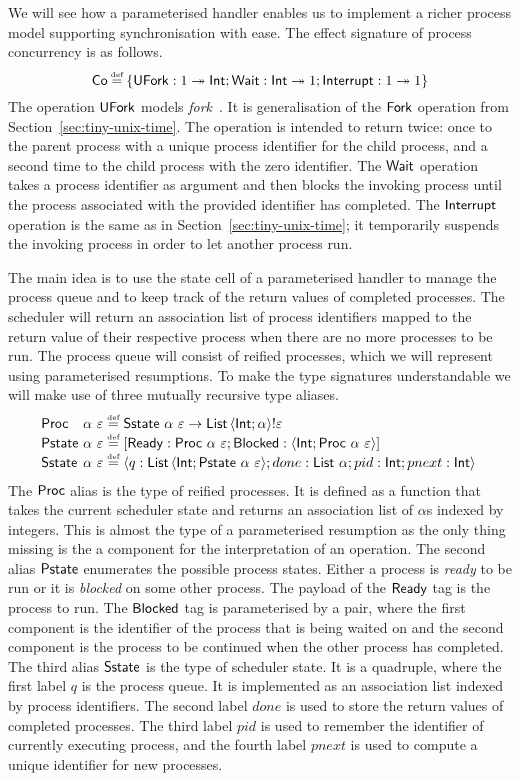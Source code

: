 \documentclass[12pt,phd,lfcs,twoside,openright,logo,leftchapter,normalheadings]{infthesis}
\theoremstyle{plain}
\theoremstyle{definition}
\begin{document}
We will see how a parameterised handler enables us to implement a
richer process model supporting synchronisation with ease. The effect
signature of process concurrency is as follows.
%
\[
  \Co \defas \{\UFork : \UnitType \opto \Int; \Wait : \Int \opto \UnitType; \Interrupt : \UnitType \opto \UnitType\}
\]
%
The operation $\mathsf{UFork}$ models \UNIX{}
\emph{fork}~\cite{RitchieT74}. It is generalisation of the $\mathsf{Fork}$
operation from Section~\ref{sec:tiny-unix-time}. The operation is
intended to return twice: once to the parent process with a unique
process identifier for the child process, and a second time to the
child process with the zero identifier. The $\mathsf{Wait}$ operation takes a
process identifier as argument and then blocks the invoking process
until the process associated with the provided identifier has
completed. The $\mathsf{Interrupt}$ operation is the same as in
Section~\ref{sec:tiny-unix-time}; it temporarily suspends the invoking
process in order to let another process run.

The main idea is to use the state cell of a parameterised handler to
manage the process queue and to keep track of the return values of
completed processes. The scheduler will return an association list of
process identifiers mapped to the return value of their respective
process when there are no more processes to be run. The process queue
will consist of reified processes, which we will represent using
parameterised resumptions. To make the type signatures understandable
we will make use of three mutually recursive type aliases.
%
\[
  \ba{@{~}l@{~}l@{~}c@{~}l}
    \Proc   &\alpha~\varepsilon   &\defas& \Sstate~\alpha~\varepsilon \to \List\,\Record{\Int;\alpha} \eff \varepsilon\\
    \Pstate &\alpha~\varepsilon &\defas& [\Ready:\Proc~\alpha~\varepsilon;\Blocked:\Record{\Int;\Proc~\alpha~\varepsilon}]\\
    \Sstate &\alpha~\varepsilon &\defas& \Record{q:\List\,\Record{\Int;\Pstate~\alpha~\varepsilon};done:\List~\alpha;pid:\Int;pnext:\Int}\\
  \ea
\]
%
The $\mathsf{Proc}$ alias is the type of reified processes. It is defined as a
function that takes the current scheduler state and returns an
association list of $\alpha$s indexed by integers. This is almost the
type of a parameterised resumption as the only thing missing is the a
component for the interpretation of an operation.
%
The second alias $\mathsf{Pstate}$ enumerates the possible process
states. Either a process is \emph{ready} to be run or it is
\emph{blocked} on some other process. The payload of the $\mathsf{Ready}$ tag
is the process to run. The $\mathsf{Blocked}$ tag is parameterised by a pair,
where the first component is the identifier of the process that is
being waited on and the second component is the process to be
continued when the other process has completed.
%
The third alias $\mathsf{Sstate}$ is the type of scheduler state. It is a
quadruple, where the first label $q$ is the process queue. It is
implemented as an association list indexed by process identifiers. The
second label $done$ is used to store the return values of completed
processes. The third label $pid$ is used to remember the identifier of
currently executing process, and the fourth label $pnext$ is used to
compute a unique identifier for new processes.
\end{document}
